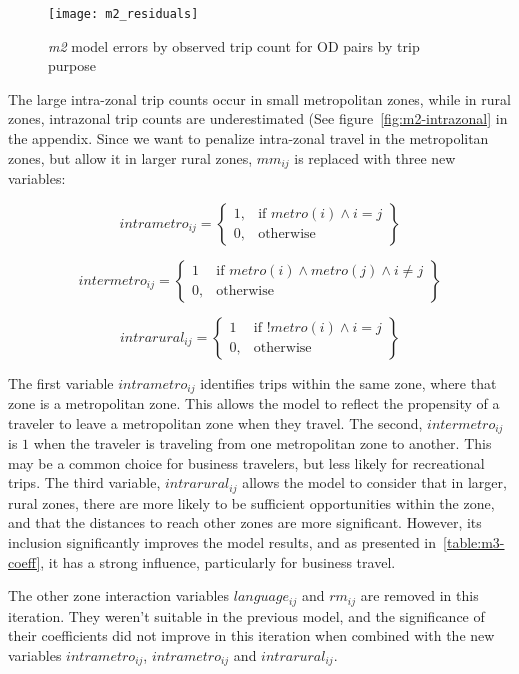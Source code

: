 \begin{figure}[H]
\centering
\texttt{[image: m2\_residuals]}
\caption{\textit{m2} model errors by observed trip count for OD pairs by trip purpose}
\label{fig:m2_residuals}
\end{figure}

The large intra-zonal trip counts occur in small metropolitan zones, while in rural zones, intrazonal trip counts are underestimated (See figure~\ref{fig:m2-intrazonal} in the appendix. Since we want to penalize intra-zonal travel in the metropolitan zones, but allow it in larger rural zones, $mm_{ij}$  is replaced with three new variables:

	$$	
	intrametro_{ij} = \left.
  \begin{cases}
    1, & \text{if } metro(i) \wedge i = j \\
    0, & \text{otherwise }
  \end{cases}
  \right\}
	$$
  
	$$	
	intermetro_{ij} = \left.
  \begin{cases}
    1 & \text{if } metro(i) \wedge metro(j) \wedge i \neq j \\
    0, & \text{otherwise } 
  \end{cases}
  \right\}
	$$  
	
	$$	
	intrarural_{ij} = \left.
  \begin{cases}
    1 & \text{if } !metro(i) \wedge i = j \\
    0, & \text{otherwise } 
  \end{cases}
  \right\}
	$$

The first variable $intrametro_{ij}$ identifies trips within the same zone, where that zone is a metropolitan zone. This allows the model to reflect the propensity of a traveler to leave a metropolitan zone when they travel. The second, $intermetro_{ij}$ is $1$ when the traveler is traveling from one metropolitan zone to another. This may be a common choice for business travelers, but less likely for recreational trips. The third variable, $intrarural_{ij}$ allows the model to consider that in larger, rural zones, there are more likely to be sufficient opportunities within the zone, and that the distances to reach other zones are more significant. However, its inclusion significantly improves the model results, and as presented in~\ref{table:m3-coeff}, it has a strong influence, particularly for business travel.

The other zone interaction variables $language_{ij}$  and $rm_{ij}$  are removed in this iteration. They weren't suitable in the previous model, and the significance of their coefficients did not improve in this iteration when combined with the new variables $intrametro_{ij}$,  $intrametro_{ij}$ and $intrarural_{ij}$.


